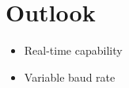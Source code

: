 \section{Outlook}
\begin{center}
    \begin{itemize}
      \item Real-time capability
      \item Variable baud rate
    \end{itemize}
\end{center}